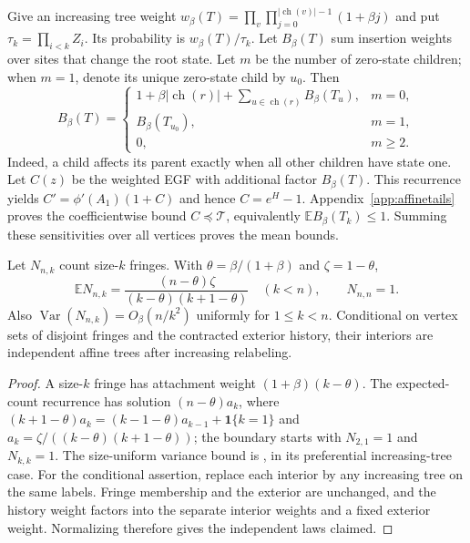 \documentclass[runningheads,envcountsame,orivec]{llncs}
\newcommand{\E}{\mathbb E}
\newcommand{\ind}{\mathbf 1}
\newcommand{\ch}{\operatorname{ch}}
\begin{document}
Give an increasing tree weight
$w_\beta(T)=\prod_v\prod_{j=0}^{|\ch(v)|-1}(1+\beta j)$ and put
$\tau_k=\prod_{i<k}Z_i$. Its probability is $w_\beta(T)/\tau_k$.
Let $B_\beta(T)$ sum insertion weights over sites that change the
root state. Let $m$ be the number of zero-state children; when $m=1$,
denote its unique zero-state child by $u_0$. Then
\begin{equation}\label{eq:Brec}
 B_\beta(T)=
 \begin{cases}
 1+\beta|\ch(r)|+\sum_{u\in\ch(r)}B_\beta(T_u),&m=0,\\
 B_\beta(T_{u_0}),&m=1,\\
 0,&m\ge2.
 \end{cases}
\end{equation}
Indeed, a child affects its parent exactly when all other children
have state one. Let $C(z)$ be the weighted EGF with additional
factor $B_\beta(T)$. This recurrence yields
$C'=\phi'(A_1)(1+C)$ and hence $C=e^H-1$.
Appendix~\ref{app:affinetails} proves the coefficientwise bound
$C\preceq\mathcal T$, equivalently $\E B_\beta(T_k)\le1$.
Summing these sensitivities over all vertices proves the mean bounds.

\begin{lemma}\label{lem:fringefacts}
Let $N_{n,k}$ count size-$k$ fringes. With
$\theta=\beta/(1+\beta)$ and $\zeta=1-\theta$,
\begin{equation}\label{eq:affinefringe}
 \E N_{n,k}=\frac{(n-\theta)\zeta}
 {(k-\theta)(k+1-\theta)}\quad(k<n),\qquad N_{n,n}=1.
\end{equation}
Also $\operatorname{Var}(N_{n,k})=O_\beta(n/k^2)$ uniformly for
$1\le k<n$. Conditional on vertex sets of disjoint fringes and the
contracted exterior history, their interiors are independent affine
trees after increasing relabeling.
\end{lemma}
\begin{proof}
A size-$k$ fringe has attachment weight $(1+\beta)(k-\theta)$.
The expected-count recurrence has solution
$(n-\theta)a_k$, where
$(k+1-\theta)a_k=(k-1-\theta)a_{k-1}+\ind\{k=1\}$ and
$a_k=\zeta/((k-\theta)(k+1-\theta))$; the boundary starts with
$N_{2,1}=1$ and $N_{k,k}=1$.
The size-uniform variance bound is
\cite[Lemma~3]{SeelbachWagner2022}, in its preferential increasing-tree
case. For the conditional assertion, replace each interior by any
increasing tree on the same labels. Fringe membership and the
exterior are unchanged, and the history weight factors into the
separate interior weights and a fixed exterior weight. Normalizing
therefore gives the independent laws claimed.
\end{proof}
\end{document}
